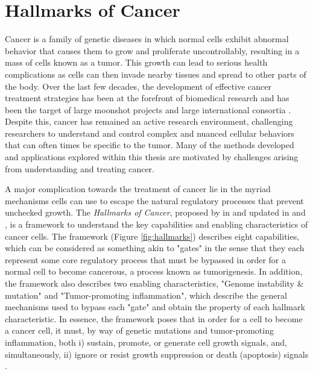 \section{Hallmarks of Cancer}
Cancer is a family of genetic diseases in which normal cells exhibit abnormal behavior that causes them to grow and proliferate uncontrollably, resulting in a mass of cells known as a tumor.
This growth can lead to serious health complications as cells
can then invade nearby tissues and spread to other parts of the body.
Over the last few decades, the development of effective cancer treatment strategies has been at the forefront of biomedical research and has been the target of large moonshot projects \cite{need} and large international consortia \cite{icgc2020}.
Despite this, cancer has remained an active research environment, challenging researchers to understand and control complex and nuanced cellular behaviors that can often times be specific to the tumor.
Many of the methods developed and applications explored within this thesis are motivated by challenges arising from understanding and treating cancer.

A major complication towards the treatment of cancer lie in the myriad mechanisms cells can use to escape the natural regulatory processes that prevent unchecked growth.
The \emph{Hallmarks of Cancer}, proposed by \citet{hanahan2000} in \citeyear{hanahan2000} and updated in \citeyear{hanahan2011} \cite{hanahan2011} and \citeyear{hanahan2022} \citep{hanahan2022}, is a framework to understand the key capabilities and enabling characteristics of cancer cells.
The framework (Figure \ref{fig:hallmarks}) describes eight capabilities, which can be considered as something akin to "gates" in the sense that they each represent some core regulatory process that must be bypassed in order for a normal cell to become cancerous, a process known as tumorigenesis.
In addition, the framework also describes two enabling characteristics, "Genome instability \& mutation" and "Tumor-promoting inflammation", which describe the general mechanisms used to bypass each "gate" and obtain the property of each hallmark characteristic.
In essence, the framework poses that in order for a cell to become a cancer cell, it must, by way of genetic mutations and tumor-promoting inflammation, both
i) sustain, promote, or generate cell growth signals, and, simultaneously,
ii) ignore or resist growth suppression or death (apoptosis) signals \cite{hanahan2011}.

